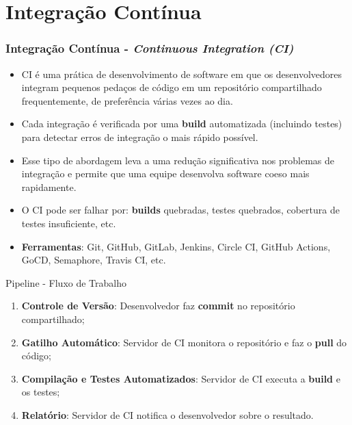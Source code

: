 \documentclass[
	9pt, %
	t, %
]{beamer}
\newcommand{\yellowbox}[1]{\colorbox{yellow!75}{#1}}
\begin{document}
\section{Integração Contínua} %


\begin{frame}
	\frametitle{Integração Contínua - \textit{Continuous Integration (CI)}}
	\begin{itemize}
		\item CI é uma \yellowbox{prática} de desenvolvimento de software em que os desenvolvedores integram \yellowbox{pequenos pedaços} de código em um repositório compartilhado \yellowbox{frequentemente}, de preferência várias vezes ao dia.
		\item Cada integração é verificada por uma \yellowbox{\textbf{build} automatizada} (incluindo testes) para detectar erros de integração o mais rápido possível.
		\item Esse tipo de abordagem leva a uma redução significativa nos problemas de integração e permite que uma equipe desenvolva software coeso mais rapidamente.
		\item O CI pode ser falhar por: \textbf{builds} quebradas, testes quebrados, cobertura de testes insuficiente, etc.
		\item \textbf{Ferramentas}: Git, GitHub, GitLab, Jenkins, Circle CI, GitHub Actions, GoCD, Semaphore, Travis CI, etc.
	\end{itemize}

	\begin{block}{Pipeline - Fluxo de Trabalho}
		\begin{enumerate}
			\item \textbf{Controle de Versão}: Desenvolvedor faz \textbf{commit} no repositório compartilhado;
			\item \textbf{Gatilho Automático}: Servidor de CI monitora o repositório e faz o \textbf{pull} do código;
			\item \textbf{Compilação e Testes Automatizados}: Servidor de CI executa a \textbf{build} e os testes;
			\item \textbf{Relatório}: Servidor de CI notifica o desenvolvedor sobre o resultado. 
		\end{enumerate}
	\end{block}

\end{frame}
\end{document}
